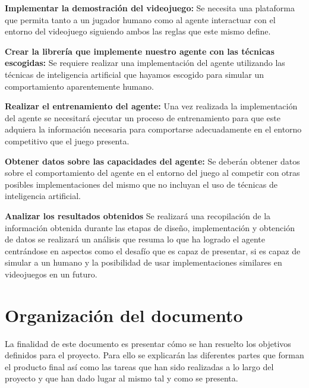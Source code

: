 \begin{enumerate}
	
	{\item {\bf Implementar la demostración del videojuego:}
		Se necesita una plataforma que permita tanto a un jugador humano como al agente interactuar con el entorno del videojuego siguiendo ambos las reglas que este mismo define.
	}

	{\item {\bf Crear la librería que implemente nuestro agente con las técnicas escogidas:}
		Se requiere realizar una implementación del agente utilizando las técnicas de inteligencia artificial que hayamos escogido para simular un comportamiento aparentemente humano.
	}

	{\item {\bf Realizar el entrenamiento del agente:}
		Una vez realizada la implementación del agente se necesitará ejecutar un proceso de entrenamiento para que este adquiera la información necesaria para comportarse adecuadamente en el entorno competitivo que el juego presenta.
	}

	{\item {\bf Obtener datos sobre las capacidades del agente:}
		Se deberán obtener datos sobre el comportamiento del agente en el entorno del juego al competir con otras posibles implementaciones del mismo que no incluyan el uso de técnicas de inteligencia artificial.
	}

	{\item {\bf Analizar los resultados obtenidos}
		Se realizará una recopilación de la información obtenida durante las etapas de diseño, implementación y obtención de datos se realizará un análisis que resuma lo que ha logrado el agente centrándose en aspectos como el desafío que es capaz de presentar, si es capaz de simular a un humano y la posibilidad de usar implementaciones similares en videojuegos en un futuro.
	}
	
\end{enumerate}

\section{Organización del documento}

La finalidad de este documento es presentar cómo se han resuelto los objetivos definidos para el proyecto. Para ello se explicarán las diferentes partes que forman el producto final así como las tareas que han sido realizadas a lo largo del proyecto y que han dado lugar al mismo tal y como se presenta.


